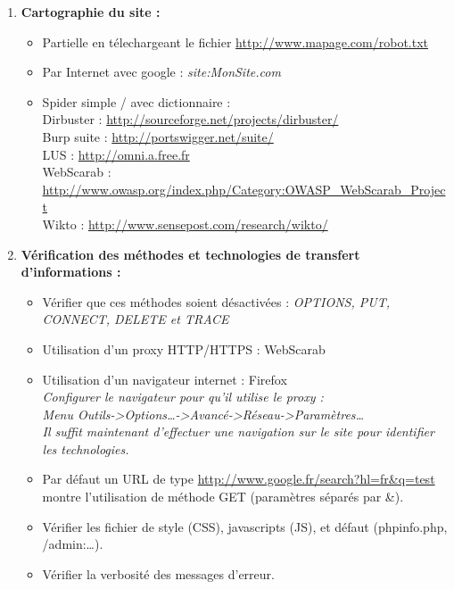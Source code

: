 \documentclass[a4paper,11pt]{article}				    %
\begin{document}
{\begin{enumerate}
	\item \textbf{Cartographie du site :}
	\begin{itemize}
		\item Partielle en t\'elechargeant le fichier \url{http://www.mapage.com/robot.txt}
		\item Par Internet avec google : {\sl \color{blue}site:MonSite.com}
		\item Spider simple / avec dictionnaire :\\
		Dirbuster : \url{http://sourceforge.net/projects/dirbuster/}\\
		Burp suite : \url{http://portswigger.net/suite/}\\
		LUS : \url{http://omni.a.free.fr}\\
		WebScarab : \url{http://www.owasp.org/index.php/Category:OWASP_WebScarab_Project}\\
		Wikto : \url{http://www.sensepost.com/research/wikto/}
	\end{itemize}

	\item \textbf{V\'erification des m\'ethodes et technologies de transfert d'informations :}
	\begin{itemize}
		\item V\'erifier que ces m\'ethodes soient d\'esactiv\'ees : {\sl \color{blue}OPTIONS, PUT, CONNECT, DELETE et TRACE} %
		\item Utilisation d'un proxy HTTP/HTTPS : WebScarab
		\item Utilisation d'un navigateur internet : Firefox\\
		\textit{Configurer le navigateur pour qu'il utilise le proxy : \\
					Menu Outils->Options\dots{}->Avanc\'e->R\'eseau->Param\`etres\dots{}\\
					Il suffit maintenant d'effectuer une navigation sur le site pour identifier les technologies.}
		\item Par d\'efaut un URL de type \url{http://www.google.fr/search?hl=fr&q=test} montre l'utilisation de m\'ethode GET (param\`etres s\'epar\'es par \&).
		\item V\'erifier les fichier de style (CSS), javascripts (JS), et d\'efaut (phpinfo.php, /admin:\dots{}).
		\item V\'erifier la verbosit\'e des messages d'erreur.\\
	\end{itemize}
\end{enumerate}
}
\end{document}
